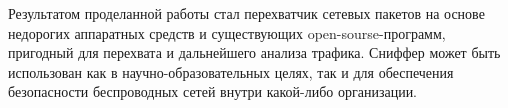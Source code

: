 Результатом проделанной работы стал перехватчик сетевых пакетов на основе недорогих аппаратных средств и существующих open-sourse-программ, пригодный для перехвата и дальнейшего анализа трафика. Сниффер может быть использован как в научно-образовательных целях, так и для обеспечения безопасности беспроводных сетей внутри какой-либо организации. 
